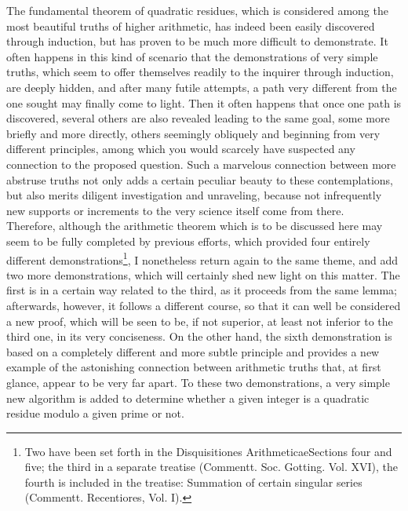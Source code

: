 \documentclass[twoside,12pt]{memoir}
\begin{document}
The fundamental theorem of quadratic residues, which is considered among the most beautiful truths of higher arithmetic, has indeed been easily discovered through induction, but has proven to be much more difficult to demonstrate. It often happens in this kind of scenario that the demonstrations of very simple truths, which seem to offer themselves readily to the inquirer through induction, are deeply hidden, and after many futile attempts, a path very different from the one sought may finally come to light. Then it often happens that once one path is discovered, several others are also revealed leading to the same goal, some more briefly and more directly, others seemingly obliquely and beginning from very different principles, among which you would scarcely have suspected any connection to the proposed question. Such a marvelous connection between more abstruse truths not only adds a certain peculiar beauty to these contemplations, but also merits diligent investigation and unraveling, because not infrequently new supports or increments to the very science itself come from there.\\

Therefore, although the arithmetic theorem which is to be discussed here may seem to be fully completed by previous efforts, which provided four entirely different demonstrations\footnote{Two have been set forth in the Disquisitiones Arithmeticae\enspace Sections four and five; the third in a separate treatise (Commentt. Soc. Gotting. Vol. XVI), the fourth is included in the treatise: Summation of certain singular series (Commentt. Recentiores, Vol. I).}, \pagebreak%
I nonetheless return again to the same theme, and add two more demonstrations, which will certainly shed new light on this matter. The first is in a certain way related to the third, as it proceeds from the same lemma; afterwards, however, it follows a different course, so that it can well be considered a new proof, which will be seen to be, if not superior, at least not inferior to the third one, in its very conciseness. On the other hand, the sixth demonstration is based on a completely different and more subtle principle and provides a new example of the astonishing connection between arithmetic truths that, at first glance, appear to be very far apart. To these two demonstrations, a very simple new algorithm is added to determine whether a given integer is a quadratic residue modulo a given prime or not.\\
\end{document}

